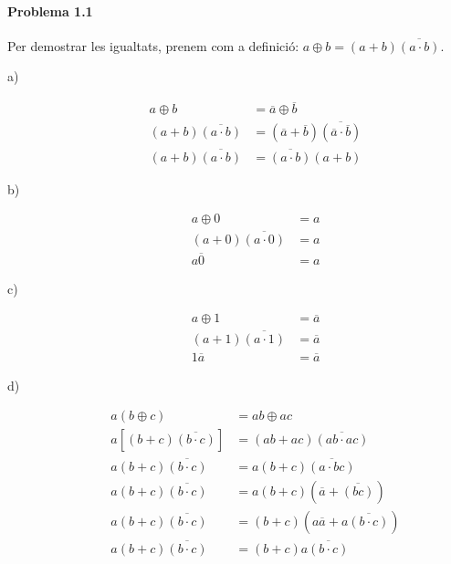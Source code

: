 \documentclass[catalan,border=15pt,class=scrartcl,multi=minipage]{standalone}
\begin{document}
\setlength{\parskip}{7pt}

\begin{minipage}{30em}

\paragraph{Problema 1.1}

Per demostrar les igualtats, prenem com a definició: $a \oplus b = \left(a + b\right)\overline{\left(a \cdot b\right)}$.

\begin{description}
\item [{a)}] \begin{align*}
  a \oplus b &= \overline{a} \oplus \overline{b} \\
  \left(a + b\right)\overline{\left(a \cdot b\right)} &= \left(\overline{a} + \overline{b}\right)\overline{\left(\overline{a} \cdot \overline{b}\right)} \\
  \left(a + b\right)\overline{\left(a \cdot b\right)} &= \overline{\left(a \cdot b\right)}\left(a + b\right)
\end{align*}

\item [{b)}] \begin{align*}
  a \oplus 0 &= a \\
  \left(a + 0\right)\overline{\left(a \cdot 0\right)} &= a \\
  a \overline{0} &= a
\end{align*}

\item [{c)}] \begin{align*}
  a \oplus 1 &= \overline{a} \\
  \left(a + 1\right)\overline{\left(a \cdot 1\right)} &= \overline{a} \\
  1 \overline{a} &= \overline{a}
\end{align*}

\item [{d)}] \begin{align*}
  a \left(b \oplus c\right) &= ab \oplus ac \\
  a \left[ \left(b + c\right)\overline{\left(b \cdot c\right)} \right] &= \left(ab + ac\right)\overline{\left(ab \cdot ac\right)} \\
  a \left(b + c\right)\overline{\left(b \cdot c\right)} &= a \left(b + c\right)\overline{\left(a \cdot bc\right)} \\
  a \left(b + c\right)\overline{\left(b \cdot c\right)} &= a \left(b + c\right)\left(\overline{a} + \overline{\left(bc\right)}\right) \\
  a \left(b + c\right)\overline{\left(b \cdot c\right)} &= \left(b + c\right)\left(a\overline{a} + a \overline{\left(b \cdot c\right)}\right) \\
  a \left(b + c\right)\overline{\left(b \cdot c\right)} &= \left(b + c\right) a \overline{\left(b \cdot c\right)}
\end{align*}


\end{description}
\end{minipage}
\end{document}
